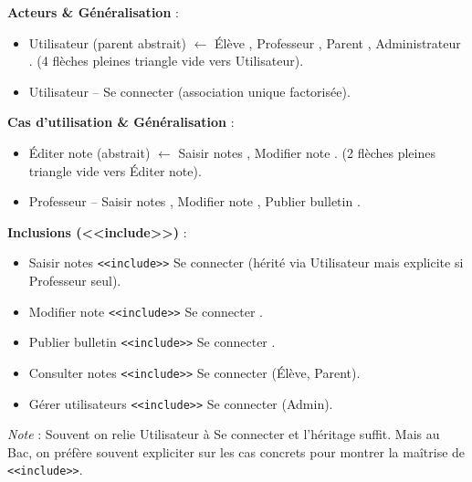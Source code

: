 \documentclass[11pt]{article}
\begin{document}
\begin{corrige}
\textbf{Acteurs \& Généralisation} :
\begin{itemize}
    \item \guillemotleft Utilisateur \guillemotright (parent abstrait) $\leftarrow$ \guillemotleft Élève \guillemotright, \guillemotleft Professeur \guillemotright, \guillemotleft Parent \guillemotright, \guillemotleft Administrateur \guillemotright. (4 flèches pleines triangle vide vers Utilisateur).
    \item \guillemotleft Utilisateur \guillemotright -- \guillemotleft Se connecter \guillemotright (association unique factorisée).
\end{itemize}

\textbf{Cas d'utilisation \& Généralisation} :
\begin{itemize}
    \item \guillemotleft Éditer note \guillemotright (abstrait) $\leftarrow$ \guillemotleft Saisir notes \guillemotright, \guillemotleft Modifier note \guillemotright. (2 flèches pleines triangle vide vers Éditer note).
    \item \guillemotleft Professeur \guillemotright -- \guillemotleft Saisir notes \guillemotright, \guillemotleft Modifier note \guillemotright, \guillemotleft Publier bulletin \guillemotright.
\end{itemize}

\textbf{Inclusions (<<include>>)} :
\begin{itemize}
    \item \guillemotleft Saisir notes \guillemotright \texttt{<<include>>} \guillemotleft Se connecter \guillemotright (hérité via Utilisateur mais explicite si Professeur seul).
    \item \guillemotleft Modifier note \guillemotright \texttt{<<include>>} \guillemotleft Se connecter \guillemotright.
    \item \guillemotleft Publier bulletin \guillemotright \texttt{<<include>>} \guillemotleft Se connecter \guillemotright.
    \item \guillemotleft Consulter notes \guillemotright \texttt{<<include>>} \guillemotleft Se connecter \guillemotright (Élève, Parent).
    \item \guillemotleft Gérer utilisateurs \guillemotright \texttt{<<include>>} \guillemotleft Se connecter \guillemotright (Admin).
\end{itemize}
\textit{Note} : Souvent on relie \guillemotleft Utilisateur \guillemotright à \guillemotleft Se connecter \guillemotright et l'héritage suffit. Mais au Bac, on préfère souvent expliciter sur les cas concrets pour montrer la maîtrise de \texttt{<<include>>}.


\end{corrige}
\end{document}
